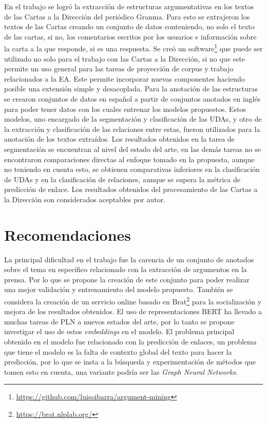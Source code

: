 \documentclass[a4paper,11pt,twocolumn,twoside]{article}
\begin{document}
En el trabajo se logró la extracción de estructuras argumentativas en los textos de las 
Cartas a la Dirección del periódico Granma. Para esto se 
extrajeron los textos de las Cartas creando un conjunto de datos
conteniendo, no solo el texto de las cartas, si no, los comentarios 
escritos por los usuarios e información sobre la carta a la que responde, si es una respuesta.
Se creó un software\footnote{\url{https://github.com/luisoibarra/argument-mining}} que puede 
ser utilizado no solo para el trabajo con las Cartas a la Dirección, si no
que este permite un uso general para las tareas de proyección de corpus y trabajo relacionados a la EA.
Este permite incorporar nuevas componentes haciendo posible una extensión simple y desacoplada. 
Para la anotación de las estructuras se crearon conjuntos de datos en español a partir de conjuntos 
anotados en inglés para poder 
tener datos con los cuales entrenar los modelos propuestos. Estos modelos, uno encargado 
de la segmentación y clasificación de las UDAs, y otro de la extracción y clasificación de las 
relaciones entre estas, fueron utilizados para la anotación de los textos extraídos.
Los resultados obtenidos en la tarea de segmentación se encuentran al nivel del estado del arte,
en las demás tareas no se encontraron comparaciones directas al enfoque tomado en la propuesta,
aunque no teniendo en cuenta esto, se obtienen comparativas inferiores en la clasificación
de UDAs y en la clasificación de relaciones, aunque se supera la métrica de predicción de enlace. 
Los resultados obtenidos del procesamiento de las Cartas a la Dirección son considerados 
aceptables por autor. 

\section{Recomendaciones}

La principal dificultad en el trabajo fue la carencia de un conjunto de anotados
sobre el tema en específico relacionado con la extracción de argumentos en la prensa.
Por lo que se propone la creación de este conjunto para poder realizar una mejor 
validación y entrenamiento del modelo propuesto. También se considera la creación de un servicio 
online basado en Brat\footnote{\url{https://brat.nlplab.org/}} para la socialización y mejora de 
los resultados obtenidos.
El uso de representaciones BERT ha llevado a muchas tareas de PLN a nuevos estados 
del arte, por lo tanto se propone investigar el uso de estos \textit{embeddings} en 
el modelo. El problema principal obtenido en el modelo fue relacionado con la 
predicción de enlaces, un problema que tiene el modelo es la falta de contexto global
del texto para hacer la predicción, por lo que se insta a la búsqueda y experimentación
de métodos que tomen esto en cuenta, una variante podría ser las \textit{Graph Neural Networks}.
\end{document}
